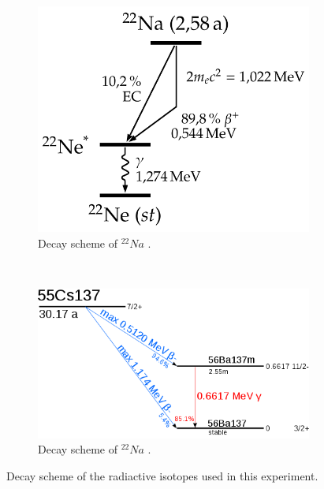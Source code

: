 \documentclass[bigchapter,colorback,accentcolor=tud4b,linedtoc,11pt]{tudreport}
\begin{document}
\begin{figure}[H]
    \centering
    \begin{subfigure}[H]{0.44\textwidth}
        \includegraphics[width=\textwidth]{img/termschema_na22.png}
        \caption{Decay scheme of $^{22}Na$ \cite{na22decay}.}
        \label{fig:gull}
    \end{subfigure}%
    \qquad
    ~%
    \begin{subfigure}[H]{0.44\textwidth}
        \includegraphics[width=\textwidth]{img/Cs-137-decay.png}
        \caption{Decay scheme of $^{22}Na$ \cite{cs137decay}.}
        \label{fig:tiger}
    \end{subfigure}
    \caption{Decay scheme of the radiactive isotopes used in this experiment.}
\end{figure}
\end{document}
